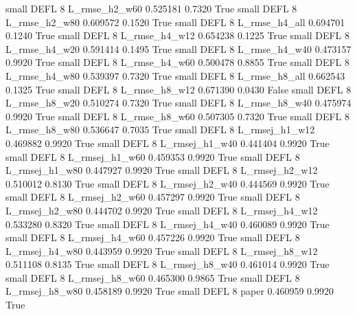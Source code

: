      small     DEFL                 8  L_rmse_h2_w60   0.525181      0.7320    True
     small     DEFL                 8  L_rmse_h2_w80   0.609572      0.1520    True
     small     DEFL                 8  L_rmse_h4_all   0.694701      0.1240    True
     small     DEFL                 8  L_rmse_h4_w12   0.654238      0.1225    True
     small     DEFL                 8  L_rmse_h4_w20   0.591414      0.1495    True
     small     DEFL                 8  L_rmse_h4_w40   0.473157      0.9920    True
     small     DEFL                 8  L_rmse_h4_w60   0.500478      0.8855    True
     small     DEFL                 8  L_rmse_h4_w80   0.539397      0.7320    True
     small     DEFL                 8  L_rmse_h8_all   0.662543      0.1325    True
     small     DEFL                 8  L_rmse_h8_w12   0.671390      0.0430   False
     small     DEFL                 8  L_rmse_h8_w20   0.510274      0.7320    True
     small     DEFL                 8  L_rmse_h8_w40   0.475974      0.9920    True
     small     DEFL                 8  L_rmse_h8_w60   0.507305      0.7320    True
     small     DEFL                 8  L_rmse_h8_w80   0.536647      0.7035    True
     small     DEFL                 8 L_rmsej_h1_w12   0.469882      0.9920    True
     small     DEFL                 8 L_rmsej_h1_w40   0.441404      0.9920    True
     small     DEFL                 8 L_rmsej_h1_w60   0.459353      0.9920    True
     small     DEFL                 8 L_rmsej_h1_w80   0.447927      0.9920    True
     small     DEFL                 8 L_rmsej_h2_w12   0.510012      0.8130    True
     small     DEFL                 8 L_rmsej_h2_w40   0.444569      0.9920    True
     small     DEFL                 8 L_rmsej_h2_w60   0.457297      0.9920    True
     small     DEFL                 8 L_rmsej_h2_w80   0.444702      0.9920    True
     small     DEFL                 8 L_rmsej_h4_w12   0.533280      0.8320    True
     small     DEFL                 8 L_rmsej_h4_w40   0.460089      0.9920    True
     small     DEFL                 8 L_rmsej_h4_w60   0.457226      0.9920    True
     small     DEFL                 8 L_rmsej_h4_w80   0.443959      0.9920    True
     small     DEFL                 8 L_rmsej_h8_w12   0.511108      0.8135    True
     small     DEFL                 8 L_rmsej_h8_w40   0.461014      0.9920    True
     small     DEFL                 8 L_rmsej_h8_w60   0.465300      0.9865    True
     small     DEFL                 8 L_rmsej_h8_w80   0.458189      0.9920    True
     small     DEFL                 8          paper   0.460959      0.9920    True
